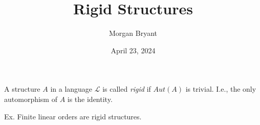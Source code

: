 \documentclass[a4paper]{article}
\title{Rigid Structures}
\date{April 23, 2024}
\author{Morgan Bryant}
\begin{document}
\maketitle
\par{A structure \(A\) in a language \(\mathcal {L}\) is called \emph{rigid} if \(Aut(A)\) is trivial. I.e., the only automorphism of \(A\) is the identity.}\par{Ex. Finite linear orders are rigid structures.}
\printbibliography
\end{document}
